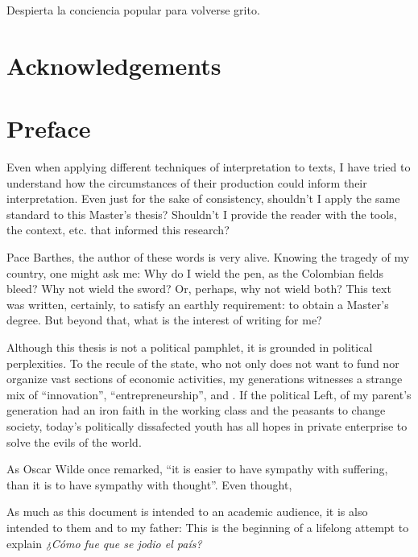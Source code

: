 \documentclass[draft=false, paper=A4,portrait,twoside=true,twocolumn=false,headinclude=false,footinclude=false,fontsize=11,BCOR=15mm,DIV=calc,pagesize=auto,titlepage=firstiscover,mpinclude=true,headings=big,headings=twolinechapter,open=right,chapterprefix=false,headsepline=false,parskip=full]{scrbook}
\begin{document}
\begin{spanish}
Despierta la conciencia popular para volverse grito.
\end{spanish}

\vspace*{\fill}

\newpage
\tableofcontents 

\frontmatter
\pagestyle{plain}
\chapter{Acknowledgements} 

\lipsum

\chapter{Preface} 

Even when applying different techniques of interpretation to texts, I have
tried to understand how the circumstances of their production could inform
their interpretation. Even just for the sake of consistency, shouldn't I
apply the same standard to this Master's thesis? Shouldn't I provide the
reader with the tools, the context, etc. that informed this research?

Pace Barthes, the author of these words is very alive. Knowing the tragedy
of my country, one might ask me: Why do I wield the pen, as the Colombian
fields bleed? Why not wield the sword? Or, perhaps, why not wield both?
This text was written, certainly, to satisfy an earthly requirement: to
obtain a Master's degree. But beyond that, what is the interest of writing
for me?

Although this thesis is not a political pamphlet, it is grounded in
political perplexities. To the recule of the state, who not only does not
want to fund nor organize vast sections of economic activities, my
generations witnesses a strange mix of ``innovation'',
``entrepreneurship'', and . If the political Left, of my parent's
generation had an iron faith in the working class and the peasants to
change society, today's politically dissafected youth has all hopes in
private enterprise to solve the evils of the world.

As Oscar Wilde once remarked, ``it is easier to have sympathy with
suffering, than it is to have sympathy with thought''. Even thought,

As much as this document is intended to an academic audience, it is also
intended to them and to my father: This is the beginning of a lifelong
attempt to explain \emph{¿Cómo fue que se jodio el país?} 
\end{document}
